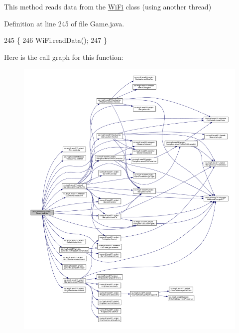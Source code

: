 This method reads data from the \hyperlink{enumca_1_1mcgill_1_1ecse211_1_1project_1_1_wi_fi}{Wi\+Fi} class (using another thread) 

Definition at line 245 of file Game.\+java.


\begin{DoxyCode}
245                          \{
246     WiFi.readData();
247   \}
\end{DoxyCode}
Here is the call graph for this function\+:\nopagebreak
\begin{figure}[H]
\begin{center}
\leavevmode
\includegraphics[width=350pt]{enumca_1_1mcgill_1_1ecse211_1_1project_1_1_game_a032b53e9b16b9d470b461de4a311a698_cgraph}
\end{center}
\end{figure}
\mbox{\label{enumca_1_1mcgill_1_1ecse211_1_1project_1_1_game_a5b304a6a59ddee3f8c7d37bba8a4c129}} 
